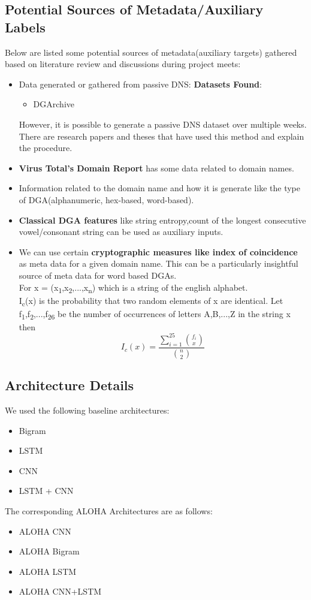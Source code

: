 \documentclass[conference]{IEEEtran}
\begin{document}
\subsection{Potential Sources of Metadata/Auxiliary Labels}
Below are listed some potential sources of metadata(auxiliary targets) gathered based on literature review and discussions during project meets:
\begin{itemize}
\item Data generated or gathered from passive DNS:
\textbf{Datasets Found}: 
\begin{itemize}
\item DGArchive\cite{b12}
\end{itemize}
However, it is possible to generate a passive DNS dataset over multiple weeks. There are research papers and theses that have used this method and explain the procedure.\cite{b10}
\item \textbf{Virus Total's Domain Report} has some data related to domain names. 
\item Information related to the domain name and how it is generate like the type of DGA(alphanumeric, hex-based, word-based).
\item \textbf{Classical DGA features} like string entropy,count of the longest consecutive vowel/consonant string can be used as auxiliary inputs.
\item  We can use certain \textbf{cryptographic measures like index of coincidence} as meta data for a given domain name. This can be a particularly insightful source of meta data for word based DGAs. \\
For x = (x\textsubscript{1},x\textsubscript{2},...,x\textsubscript{n}) which is a string of the english alphabet.\\
I\textsubscript{c}(x) is the probability that two random elements of x are identical. Let f\textsubscript{1},f\textsubscript{2},...,f\textsubscript{26} be the number of occurrences of letters A,B,...,Z in the string x then
\begin{equation}
      \label{eq:index_of_coincidence}
  I_{c}(x) = \frac{\sum^{25}_{i=1} \binom{f_{i}}{x}}{\binom{n}{2}} 
\end{equation}
\end{itemize}
\subsection{Architecture Details}
We used the following baseline architectures:
\begin{itemize}
\item Bigram
\item LSTM \cite{b6}
\item CNN   \cite{b7}
\item LSTM + CNN \cite{b6,b7}
\end{itemize}
The corresponding ALOHA Architectures are as follows:
\begin{itemize}
\item ALOHA CNN
\item ALOHA Bigram
\item ALOHA LSTM
\item ALOHA CNN+LSTM
\end{itemize}
\end{document}
